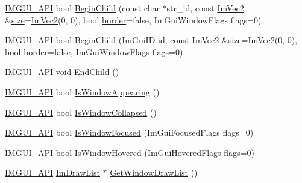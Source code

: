 \begin{DoxyCompactItemize}
\item 
\hyperlink{imgui_8h_a43829975e84e45d1149597467a14bbf5}{I\+M\+G\+U\+I\+\_\+\+A\+PI} bool \hyperlink{namespaceImGui_a5db08f552118a1f946e19b5933dce181}{Begin\+Child} (const char $\ast$str\+\_\+id, const \hyperlink{structImVec2}{Im\+Vec2} \&\hyperlink{imgui__impl__opengl3__loader_8h_a3d1e3edfcf61ca2d831883e1afbad89e}{size}=\hyperlink{structImVec2}{Im\+Vec2}(0, 0), bool \hyperlink{imgui__impl__opengl3__loader_8h_a04bf50a0ceff267d0040a99e545d74e9}{border}=false, Im\+Gui\+Window\+Flags flags=0)
\item 
\hyperlink{imgui_8h_a43829975e84e45d1149597467a14bbf5}{I\+M\+G\+U\+I\+\_\+\+A\+PI} bool \hyperlink{namespaceImGui_a7001666723434ae00316b8a0160e7de0}{Begin\+Child} (Im\+Gui\+ID id, const \hyperlink{structImVec2}{Im\+Vec2} \&\hyperlink{imgui__impl__opengl3__loader_8h_a3d1e3edfcf61ca2d831883e1afbad89e}{size}=\hyperlink{structImVec2}{Im\+Vec2}(0, 0), bool \hyperlink{imgui__impl__opengl3__loader_8h_a04bf50a0ceff267d0040a99e545d74e9}{border}=false, Im\+Gui\+Window\+Flags flags=0)
\item 
\hyperlink{imgui_8h_a43829975e84e45d1149597467a14bbf5}{I\+M\+G\+U\+I\+\_\+\+A\+PI} \hyperlink{imgui__impl__opengl3__loader_8h_ac668e7cffd9e2e9cfee428b9b2f34fa7}{void} \hyperlink{namespaceImGui_af8de559a88c1442d6df8c1b04c86e997}{End\+Child} ()
\item 
\hyperlink{imgui_8h_a43829975e84e45d1149597467a14bbf5}{I\+M\+G\+U\+I\+\_\+\+A\+PI} bool \hyperlink{namespaceImGui_a99fd14154aae264087d471132e56a42e}{Is\+Window\+Appearing} ()
\item 
\hyperlink{imgui_8h_a43829975e84e45d1149597467a14bbf5}{I\+M\+G\+U\+I\+\_\+\+A\+PI} bool \hyperlink{namespaceImGui_a2a6492aea9013c0078fc530a66e11768}{Is\+Window\+Collapsed} ()
\item 
\hyperlink{imgui_8h_a43829975e84e45d1149597467a14bbf5}{I\+M\+G\+U\+I\+\_\+\+A\+PI} bool \hyperlink{namespaceImGui_a51ed119ab4be7fcf47a34644e262c87e}{Is\+Window\+Focused} (Im\+Gui\+Focused\+Flags flags=0)
\item 
\hyperlink{imgui_8h_a43829975e84e45d1149597467a14bbf5}{I\+M\+G\+U\+I\+\_\+\+A\+PI} bool \hyperlink{namespaceImGui_aaed1ebf40cc2cb2ec30b0ba39b91d4a5}{Is\+Window\+Hovered} (Im\+Gui\+Hovered\+Flags flags=0)
\item 
\hyperlink{imgui_8h_a43829975e84e45d1149597467a14bbf5}{I\+M\+G\+U\+I\+\_\+\+A\+PI} \hyperlink{structImDrawList}{Im\+Draw\+List} $\ast$ \hyperlink{namespaceImGui_aa100c22a9feafe843fa12c66590cbda0}{Get\+Window\+Draw\+List} ()
\item 

\end{DoxyCompactItemize}
